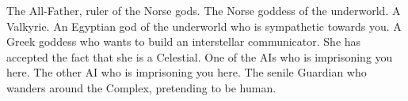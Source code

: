\documentclass[char]{guardians}
\begin{document}
\begin{contacts}
  \contact{\cOdin{}} The All-Father, ruler of the Norse gods.
  \contact{\cHel{}} The Norse goddess of the underworld.
  \contact{\cVal{}} A Valkyrie.
  \contact{\cAnubis{}} An Egyptian god of the underworld who is sympathetic towards you.
  \contact{\cAthena{}} A Greek goddess who wants to build an interstellar communicator. She has accepted the fact that she is a Celestial.
   One of the AIs who is imprisoning you here.
   The other AI who is imprisoning you here.
  \contact{\cJascha{}} The senile Guardian who wanders around the Complex, pretending to be human.
\end{contacts}
\end{document}
